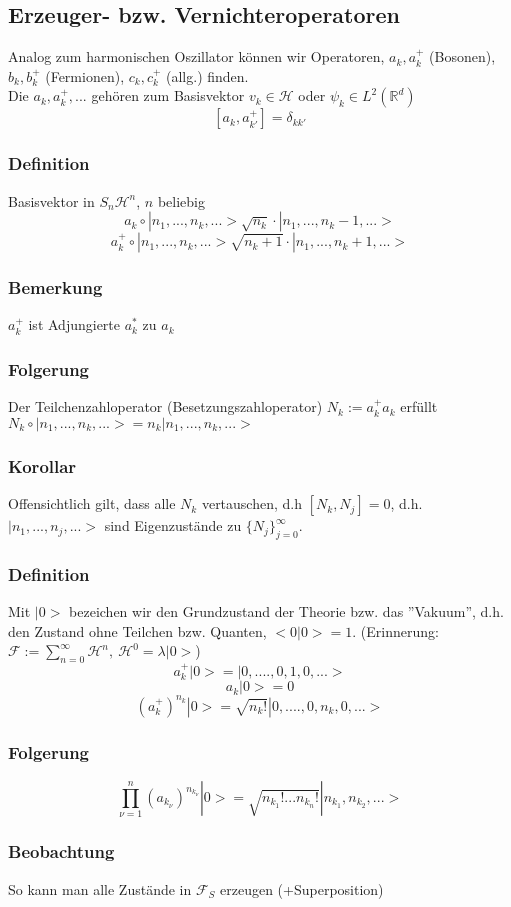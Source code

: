 \documentclass[twoside,a4paper]{scrartcl}
\newcommand{\R}{\mathbb{R}}
\renewcommand{\1}{\mathds{1}}
\renewcommand{\l}{\lambda}
\renewcommand{\H}{\mathcal{H}}
\newcommand{\F}{\mathcal{F}}
\renewcommand{\R}{\mathbb{R}}
\begin{document}
\subsection{Erzeuger- bzw. Vernichteroperatoren} 
Analog zum harmonischen Oszillator können wir Operatoren, $a_k,a^+_k$ (Bosonen), $b_k,b^+_k$ (Fermionen), $c_k,c^+_k$ (allg.) finden.\\
Die $a_k,a_k^+,...$ gehören zum Basisvektor $v_k\in \H$ oder $\psi_k \in L^2(\R^d)$
$$[a_k,a_{k'}^+]=\delta_{kk'}$$
\subsubsection*{Definition} 
Basisvektor in $S_n\H^n$, $n$ beliebig
$$a_k \circ |n_1,...,n_k,...>\sqrt{n_k} \cdot |n_1,..., n_k-1,...>$$
$$a^+_k \circ |n_1,...,n_k,...>\sqrt{n_k+1} \cdot |n_1,..., n_k+1,...>$$
\subsubsection*{Bemerkung} 
$a_k^+$ ist Adjungierte $a_k^*$ zu $a_k$
\subsubsection*{Folgerung} 
Der Teilchenzahloperator (Besetzungszahloperator) $N_k:=a_k^+a_k$ erfüllt $N_k \circ |n_1,...,n_k,...>=n_k|n_1,...,n_k,...>$
\subsubsection*{Korollar} 
Offensichtlich gilt, dass alle $N_k$ vertauschen, d.h $[N_k,N_j]=0$, d.h. $|n_1,...,n_j,...>$ sind Eigenzustände zu $\{N_j\}_{j=0}^\infty$.
\subsubsection*{Definition} 
Mit $|0>$ bezeichen wir den Grundzustand der Theorie bzw. das ''Vakuum'', d.h. den Zustand ohne Teilchen bzw. Quanten, $<0|0>=1$. (Erinnerung: $\F:=\sum_{n=0}^\infty \H^n, \ \H^0=\l |0>$)
$$a_k^+|0>=|0,....,0,1,0,...>$$
$$a_k|0>=0$$
$$(a_k^+)^{n_k}|0>=\sqrt{n_k!}|0,....,0,n_k,0,...>$$
\subsubsection*{Folgerung} 
$$\prod_{\nu=1}^n (a_{k_\nu})^{n_{k_\nu}}|0>=\sqrt{n_{k_1}!...n_{k_n}!}|n_{k_1},n_{k_2},...>$$
\subsubsection*{Beobachtung} 
So kann man alle Zustände in $\F_S$ erzeugen (+Superposition) 
\end{document}
